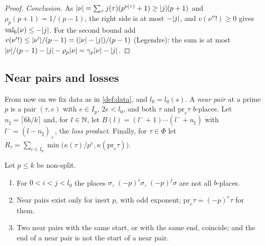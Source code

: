 \begin{proof}
\emph{Conclusion.} As $\lvert \nu\rvert=\sum_\tau j(\tau)(p^{e(\tau)}+1)\ge\lvert j\rvert(p+1)$ and $\rho_p(p+1)=1/(p-1)$, the right side is at most $-\lvert j\rvert$, and $v(\nu''!)\ge0$ gives $\mathrm{val}_6(\nu)\le-\lvert j\rvert$. For the second bound add $v(\nu'!)\le\lvert \nu'\rvert/(p-1)=(\lvert \nu\rvert-\lvert j\rvert)/(p-1)$ (Legendre): the sum is at most $\lvert \nu\rvert/(p-1)-\lvert j\rvert-\rho_p\lvert \nu\rvert=\gamma_p\lvert \nu\rvert-\lvert j\rvert$.
\end{proof}

\subsection{Near pairs and losses}\label{ss:near-pairs}
From now on we fix data as in \cref{def:data}, and $l_0=l_0(s)$. A \emph{near pair} at a prime $p$ is a
pair $(\tau,e)$ with $e\in I_p$, $2e<l_0$, and both $\tau$ and $\mathrm{pr}_e\tau$ $b$-places. Let
$n_\sharp=\lceil6b/k\rceil$ and, for $l\in\mathbb{N}$, let $B(l)=(l^-+1)\cdots(l^-+n_\sharp)$ with
$l^-=(l-n_\sharp)_+$, the \emph{loss product}. Finally, for $\tau\in\Phi$ let
$R_\tau=\sum_{e\in I_p}\min\bigl(\kappa(\tau)/p^e,\kappa(\mathrm{pr}_e\tau)\bigr)$.

\begin{lemma}\label{lem:near-pairs}
Let $p\le k$ be non-split.
\begin{enumerate}[label=\textup{(\alph*)}]
\item For $0<i<j<l_0$ the places $\sigma$, $(-p)^i\sigma$, $(-p)^j\sigma$ are not all $b$-places.
\item Near pairs exist only for inert $p$, with odd exponent; $\mathrm{pr}_e\tau=(-p)^e\tau$ for them.
\item Two near pairs with the same start, or with the same end, coincide; and the end of a near pair is
not the start of a near pair.
\end{enumerate}
\end{lemma}

